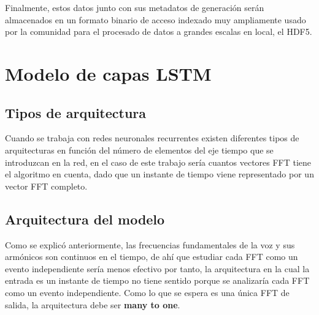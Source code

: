 Finalmente, estos datos junto con sus metadatos de generación serán almacenados en un formato binario de acceso indexado muy ampliamente usado por la comunidad para el procesado de datos a grandes escalas en local, el \gls{HDF5}.

\section{Modelo de capas \acrshort{LSTM}}

\subsection{Tipos de arquitectura}
Cuando se trabaja con redes neuronales recurrentes existen diferentes tipos de arquitecturas en función del número de elementos del eje tiempo que se introduzcan en la red, en el caso de este trabajo sería cuantos vectores \gls{FFT} tiene el algoritmo en cuenta, dado que un instante de tiempo viene representado por un vector \gls{FFT} completo. 

\subsection{Arquitectura del modelo}
Como se explicó anteriormente, las frecuencias fundamentales de la voz y sus armónicos son continuos en el tiempo, de ahí que estudiar cada \gls{FFT} como un evento independiente sería menos efectivo por tanto, la arquitectura en la cual la entrada es un instante de tiempo no tiene sentido porque se analizaría cada \gls{FFT} como un evento independiente. Como lo que se espera es una única \gls{FFT} de salida, la arquitectura debe ser \textbf{many to one}.
